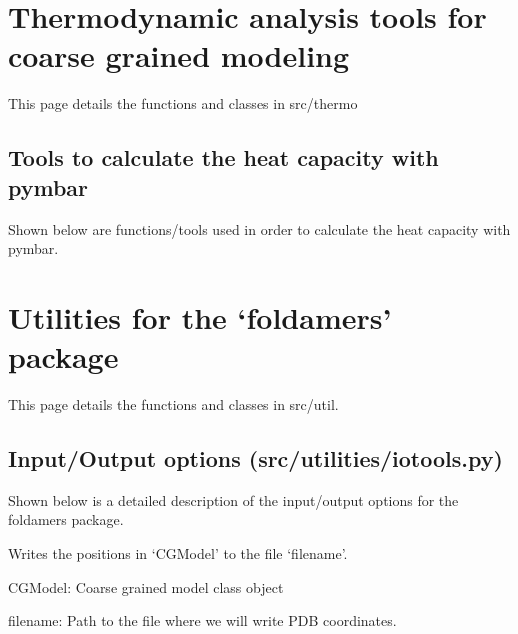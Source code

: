 \documentclass[letterpaper,12pt,english,openany,oneside]{sphinxmanual}
\begin{document}
\chapter{Thermodynamic analysis tools for coarse grained modeling}
\label{\detokenize{thermo:thermodynamic-analysis-tools-for-coarse-grained-modeling}}\label{\detokenize{thermo::doc}}
This page details the functions and classes in src/thermo


\section{Tools to calculate the heat capacity with pymbar}
\label{\detokenize{thermo:tools-to-calculate-the-heat-capacity-with-pymbar}}
Shown below are functions/tools used in order to calculate
the heat capacity with pymbar.


\chapter{Utilities for the ‘foldamers’ package}
\label{\detokenize{utilities:utilities-for-the-foldamers-package}}\label{\detokenize{utilities::doc}}
This page details the functions and classes in src/util.


\section{Input/Output options (src/utilities/iotools.py)}
\label{\detokenize{utilities:input-output-options-src-utilities-iotools-py}}
Shown below is a detailed description of the input/output
options for the foldamers package.

\label{\detokenize{utilities:module-utilities.iotools}}

\begin{fulllineitems}
\label{\detokenize{utilities:utilities.iotools.write_pdbfile_without_topology}}
Writes the positions in ‘CGModel’ to the file ‘filename’.

CGModel: Coarse grained model class object

filename: Path to the file where we will write PDB coordinates.

\end{fulllineitems}
\end{document}
